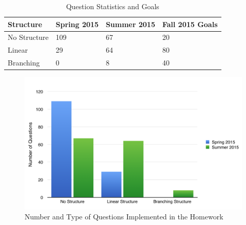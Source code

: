 \pagebreak\clearpage

\begin{table}
  \centering
  \begin{tabular}{|l|l|l|l|}
    \hline
    \textbf{Structure} & \textbf{Spring 2015} & \textbf{Summer 2015} & \textbf{Fall 2015 Goals}\\
	\hline
	No Structure & 109 & 67 & 20\\
	\hline
	Linear & 29 & 64 & 80\\
	\hline
	Branching & 0 & 8 & 40\\
	\hline
  \end{tabular}
  \caption{Question Statistics and Goals}
  \label{tab:questionStats}
\end{table}

\pagebreak\clearpage

\begin{figure}
	\centering
	\includegraphics[width=6in]{img/chapter4/question_statistics}
	\caption{Number and Type of Questions Implemented in the Homework}
  \label{fig:questionStatistics}
\end{figure}

\pagebreak\clearpage

